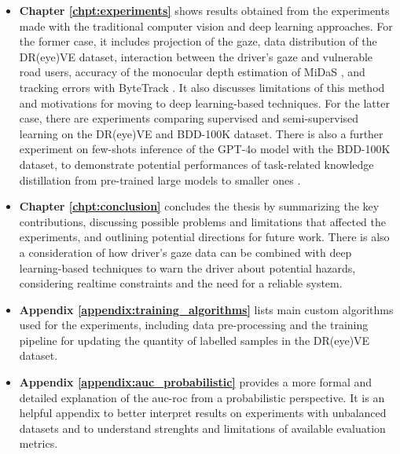\begin{itemize}
    \item \textbf{Chapter \ref{chpt:experiments}} shows results obtained from 
    the experiments made with the traditional computer vision and deep learning 
    approaches. For the former case, it includes projection of the gaze, 
    data distribution of the DR(eye)VE dataset, interaction between the 
    driver's gaze and vulnerable road users, accuracy of the monocular depth 
    estimation of MiDaS \cite{midas}, and tracking errors with ByteTrack \cite{bytetrack}. 
    It also discusses limitations of this method 
    and motivations for moving to deep learning-based techniques.
    For the latter case, there are experiments comparing supervised and 
    semi-supervised learning on the DR(eye)VE and BDD-100K dataset. There is also 
    a further experiment on few-shots inference of the GPT-4o model with the 
    BDD-100K dataset, to demonstrate potential performances of task-related 
    knowledge distillation from pre-trained large models to smaller ones
    \cite{yu_knowledge_distillation}.

    \item \textbf{Chapter \ref{chpt:conclusion}} concludes the thesis by summarizing 
    the key contributions, discussing possible problems and limitations that 
    affected the experiments, and outlining potential directions for future work.
    There is also a consideration of how driver's gaze data can be combined with 
    deep learning-based techniques to warn the driver about potential hazards, 
    considering realtime constraints and the need for a reliable system.
    \item \textbf{Appendix \ref{appendix:training_algorithms}} lists main custom 
    algorithms used for the experiments, including data pre-processing and the 
    training pipeline for updating the quantity of labelled samples in the DR(eye)VE dataset.
    \item \textbf{Appendix \ref{appendix:auc_probabilistic}} provides a more 
    formal and detailed explanation of the \acs{auc}-\acs{roc} from a probabilistic
    perspective. It is an helpful appendix to better interpret results on 
    experiments with unbalanced datasets and to understand strenghts and 
    limitations of available evaluation metrics.
\end{itemize}
